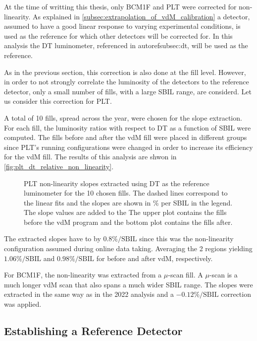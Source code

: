At the time of writting this thesis, only BCM1F and PLT were corrected for non-linearity. As explained in \autoref{subsec:extrapolation_of_vdM_calibration} a detector, assumed to have a good linear response to varying experimental conditions, is used as the reference for which other detectors will be corrected for. In this analysis the DT luminometer, referenced in autoref{subsec:dt}, will be used as the reference.

As in the previous section, this correction is also done at the fill level. However, in order to not strongly correlate the luminosity of the detectors to the reference detector, only a small number of fills, with a large SBIL range, are considerd. Let us consider this correction for PLT.

A total of 10 fills, spread across the year, were chosen for the slope extraction. For each fill, the luminosity ratios with respect to DT as a function of SBIL were computed. The fills before and after the vdM fill were placed in different groups since PLT's running configurations were changed in order to increase its efficiency for the vdM fill. The results of this analysis are shwon in \autoref{fig:plt_dt_relative_non_linearity}.

\begin{figure}[!htb]
	\centering
	\caption{PLT non-linearity slopes extracted using DT as the reference luminometer for the 10 chosen fills. The dashed lines correspond to the linear fits and the slopes are shown in \% per SBIL in the legend. The slope values are added to the The upper plot contains the fills before the vdM program and the bottom plot contains the fills after.}
	\label{fig:plt_dt_relative_non_linearity}
\end{figure}

The extracted slopes have to by $0.8\%/\text{SBIL}$ since this was the non-linearity configuration assumed during online data taking. Averaging the 2 regions yielding $1.06\%/\text{SBIL}$ and $0.98\%/\text{SBIL}$ for before and after vdM, respectively. 

For BCM1F, the non-linearity was extracted from a $\mu$-scan fill. A $\mu$-scan is a much longer vdM scan that also spans a much wider SBIL range. The slopes were extracted in the same way as in the 2022 analysis \cite{CMS-PAS-LUM-22-001} and a $-0.12\%/\text{SBIL}$ correction was applied.

\subsection{Establishing a Reference Detector}

